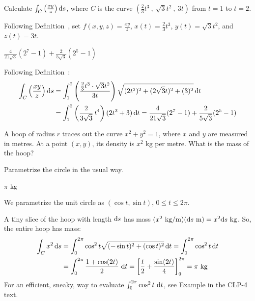 \begin{question}
Calculate $\int_C \left(\frac{xy}{z}\right)\mathrm{d}s$, where $C$ is the curve $\left( \frac23t^3~,~\sqrt{3}t^2~,~3t \right)$ from $t=1$ to $t=2$.
\end{question}
\begin{hint}
Following Definition~, set $f(x,y,z)=\frac{xy}{z}$, $x(t)=\frac23 t^3$, $y(t)=\sqrt3t^2$, and $z(t)=3t$.
\end{hint}
\begin{answer}
$ \frac{4}{21\sqrt 3}(2^7-1) + \frac{2}{5\sqrt 3}(2^5-1)$
\end{answer}
\begin{solution}
Following Definition~:
\begin{align*}
\int_C \left(\frac{xy}{z}\right)\mathrm{d}s&=\int_1^2 \left(\frac{\frac23t^3 \cdot \sqrt{3}t^2}{ 3t} \right)\sqrt{(2t^2)^2+(2\sqrt3 t)^2+(3)^2}\,\mathrm{d}t\\
&=\int_1^2 \left(\frac{2}{ 3\sqrt 3} \,t^4\right)(2t^2+3)\,\mathrm{d}t = \frac{4}{21\sqrt 3}(2^7-1) + \frac{2}{5\sqrt 3}(2^5-1)
\end{align*}
\end{solution}
\begin{question}
	A hoop of radius $r$ traces out the curve $x^2+y^2=1$, where $x$ and $y$ are measured in metres. At a point $(x,y)$, its density is $x^2$ kg per metre. What is the mass of the hoop?
\end{question}
\begin{hint}
	Parametrize the circle in the usual way.
\end{hint}
\begin{answer}
	$\pi$ kg
\end{answer}
\begin{solution}
	We parametrize the unit circle as $(\cos t, \sin t)$, $0 \le t \le 2\pi$.
	
		A tiny slice of the hoop with length $\mathrm{d}s$ has mass $(x^2~ \mathrm{kg}/\mathrm{m})(\mathrm{d}s~ \mathrm{m})=x^2\mathrm{d}s~ \mathrm{kg}$. So, the entire hoop has mass:
		\begin{align*}
			\int_C x^2\,\mathrm{d}s&=\int_0^{2\pi} \cos^2 t \sqrt{(-\sin t)^2+(\cos t)^2}\,\mathrm{d}t=\int_0^{2\pi} \cos^2 t \,\mathrm{d}t\\
&=\int_0^{2\pi} \frac{1+\cos(2t)}{2}\ \mathrm{d}t
                 =\left[\frac{t}{2} +\frac{\sin(2t)}{4} \right]_0^{2\pi}=\pi ~\mathrm{kg}
			\end{align*}
			 For an efficient, sneaky, way to evaluate 
                 $\int_0^{2\pi} \cos^2 t\ \mathrm{d}t$, see Example
                  in the CLP-4 text.
\end{solution}


